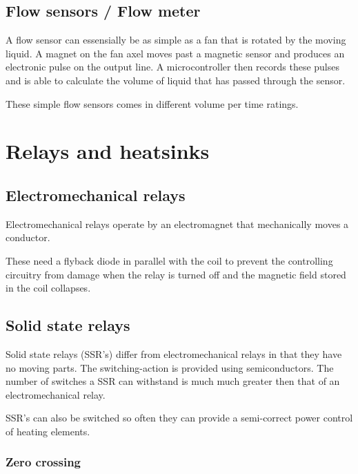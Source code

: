 \documentclass[11pt,fleqn,openany]{book} %
\begin{document}
\section{Flow sensors / Flow meter}

A flow sensor can essensially be as simple as a fan that is rotated by the moving liquid. A magnet on the fan axel moves past a magnetic sensor and produces an electronic pulse on the output line. A microcontroller then records these pulses and is able to calculate the volume of liquid that has passed through the sensor.

These simple flow sensors comes in different volume per time ratings. 



\chapter{Relays and heatsinks}

\section{Electromechanical relays}

Electromechanical relays operate by an electromagnet that mechanically moves a conductor.

These need a flyback diode in parallel with the coil to prevent the controlling circuitry from damage when the relay is turned off and the magnetic field stored in the coil collapses. 

\section{Solid state relays}

Solid state relays (SSR's) differ from electromechanical relays in that they have no moving parts. The switching-action is provided using semiconductors. The number of switches a SSR can withstand is much much greater then that of an electromechanical relay.

SSR's can also be switched so often they can provide a semi-correct power control of heating elements. 

\subsection{Zero crossing}
\end{document}
